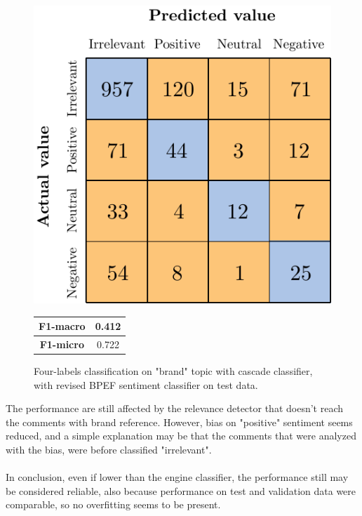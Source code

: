 \begin{figure}[H]
	\begin{minipage}[b]{0.6\linewidth}
		\centering
		\includegraphics[scale=1]{figures/conf_matrices/ita_brand/ita_cascade_brand_bpef_tst.pdf}
	\end{minipage}
	\begin{minipage}[b]{0.3\linewidth}
		\begin{tabular}[b]{ | c | c | } 
			\hline
			\textbf{F1-macro} & 0.412 \\
			\hline
			\textbf{F1-micro} & 0.722 \\ 
			\hline
		\end{tabular}
	\end{minipage}
	\caption{Four-labels classification on "brand" topic with cascade classifier, with revised BPEF sentiment classifier on test data.}
	\label{fig:ita_cascade_brand_bpef_tst}
\end{figure}

The performance are still affected by the relevance detector that doesn't reach the comments with brand reference. However, bias on "positive" sentiment seems reduced, and a simple explanation may be that the comments that were analyzed with the bias, were before classified "irrelevant".\\\\
In conclusion, even if lower than the engine classifier, the performance still may be considered reliable, also because performance on test and validation data were comparable, so no overfitting seems to be present.


